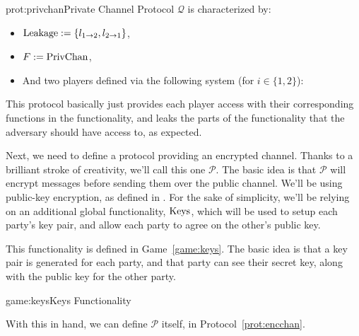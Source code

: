 \begin{protocol}{prot:privchan}{Private Channel Protocol}
    $\mathcal{Q}$ is characterized by:
    \begin{itemize}
        \item $\text{Leakage} := \{l_{1\to 2}, l_{2\to1}\}$,
        \item $F := \text{PrivChan}$,
        \item And two players defined via the following system (for $i \in \{1, 2\}$):
    \end{itemize}

\end{protocol}

This protocol basically just provides each player access with their corresponding
functions in the functionality, and leaks the parts of the functionality
that the adversary should have access to, as expected.

Next, we need to define a protocol providing an encrypted channel.
Thanks to a brilliant stroke of creativity, we'll call this one $\mathcal{P}$.
The basic idea is that $\mathcal{P}$ will encrypt messages before sending
them over the public channel.
We'll be using public-key encryption, as defined in .
For the sake of simplicity, we'll be relying on an additional global functionality,
$\text{Keys}$, which will be used to setup each party's key pair, and allow
each party to agree on the other's public key.

This functionality is defined in Game~\ref{game:keys}.
The basic idea is that a key pair is generated for each party,
and that party can see their secret key, along with the public key for the other party.

\begin{game}{game:keys}{Keys Functionality}
\end{game}

With this in hand, we can define $\mathcal{P}$ itself, in Protocol~\ref{prot:encchan}.

